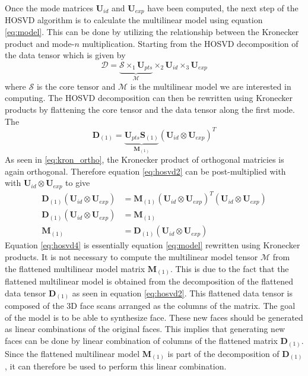 \documentclass[11pt,a4paper]{report}
\begin{document}
Once the mode matrices $\mathbf{U}_{id}$ and $\mathbf{U}_{exp}$ have been
computed, the next step of the HOSVD algorithm is to calculate the multilinear model using equation
\ref{eq:model}. This can be done by utilizing the relationship between the
Kronecker product and mode-$n$ multiplication. Starting from the HOSVD
decomposition of the data tensor which is given by
\begin{equation}
\mathcal{D} = \underbrace{\mathcal{S} \times_1 \mathbf{U}_{pts}}_{\mathcal{M}} \times_2 \mathbf{U}_{id} \times_3 \mathbf{U}_{exp}
\end{equation}
where $\mathcal{S}$ is the core tensor and $\mathcal{M}$ is the multilinear
model we are interested in computing. The HOSVD decomposition can then be
rewritten using Kronecker products by flattening the core tensor and the data
tensor along the first mode. The 
\begin{equation}\label{eq:hosvd2}
\mathbf{D}_{(1)} = \underbrace{\mathbf{U}_{pts}\mathbf{S}_{(1)}}_{\mathbf{M}_{(1)}} (\mathbf{U}_{id} \otimes \mathbf{U}_{exp})^T
\end{equation}
As seen in \ref{eq:kron_ortho}, the Kronecker product of orthogonal matricies is
again orthogonal. Therefore equation \ref{eq:hosvd2} can be post-multiplied with
with $\mathbf{U}_{id} \otimes \mathbf{U}_{exp}$ to give
\begin{align}\label{eq:hosvd3}
\mathbf{D}_{(1)} (\mathbf{U}_{id} \otimes \mathbf{U}_{exp}) &= \mathbf{M}_{(1)}
(\mathbf{U}_{id} \otimes \mathbf{U}_{exp})^T (\mathbf{U}_{id} \otimes
\mathbf{U}_{exp})\\
\mathbf{D}_{(1)} (\mathbf{U}_{id} \otimes \mathbf{U}_{exp}) &=
\mathbf{M}_{(1)}\\
\label{eq:hosvd4}
\mathbf{M}_{(1)} &= \mathbf{D}_{(1)} (\mathbf{U}_{id} \otimes \mathbf{U}_{exp})
\end{align}
Equation \ref{eq:hosvd4} is essentially equation \ref{eq:model} rewritten using Kronecker
products. It is not necessary to compute the
multilinear model tensor $\mathcal{M}$ from the flattened multilinear
model matrix $\mathbf{M}_{(1)}$. This is due to the fact that the flattened multilinear
model is obtained from the decomposition of the flattened data tensor
$\mathbf{D}_{(1)}$ as seen in equation \ref{eq:hosvd2}. This flattened data
tensor is composed of the 3D face scans arranged as the columns of the
matrix. The goal of the model is to be able to synthesize face. These new faces
should be generated as linear combinations of the
original faces. This implies that generating new faces can be done by linear
combination of columns of the flattened matrix $\mathbf{D}_{(1)}$. Since the
flattened multilinear model $\mathbf{M}_{(1)}$ is part of the decomposition of
$\mathbf{D}_{(1)}$, it can therefore be used to perform this
linear combination.\\
\end{document}
